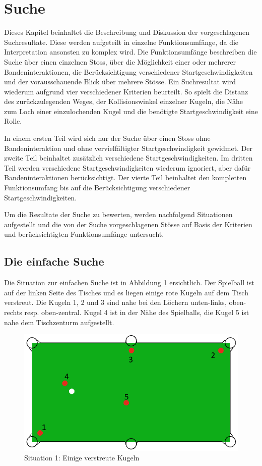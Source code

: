\section{Suche}
Dieses Kapitel beinhaltet die Beschreibung und Diskussion der vorgeschlagenen Suchresultate. Diese werden aufgeteilt
in einzelne Funktionsumfänge, da die Interpretation ansonsten zu komplex wird. Die Funktionsumfänge beschreiben die Suche
über einen einzelnen Stoss, über die Möglichkeit einer oder mehrerer Bandeninteraktionen, die Berücksichtigung verschiedener
Startgeschwindigkeiten und der vorausschauende Blick über mehrere Stösse.
Ein Suchresultat wird wiederum aufgrund vier verschiedener
Kriterien beurteilt. So spielt die Distanz des zurückzulegenden Weges, der Kollisionswinkel einzelner Kugeln, die Nähe
zum Loch einer einzulochenden Kugel und die benötigte Startgeschwindigkeit eine Rolle.

In einem ersten Teil wird sich nur der Suche über einen Stoss ohne Bandeninteraktion und ohne
vervielfältigter Startgeschwindigkeit gewidmet. Der zweite Teil beinhaltet zusätzlich verschiedene Startgeschwindigkeiten.
Im dritten Teil werden verschiedene Startgeschwindigkeiten wiederum ignoriert, aber dafür Bandeninteraktionen berücksichtigt.
Der vierte Teil beinhaltet den kompletten Funktionsumfang bis auf die Berücksichtigung verschiedener Startgeschwindigkeiten.

Um die Resultate der Suche zu bewerten, werden nachfolgend Situationen aufgestellt und die von der Suche
vorgeschlagenen Stösse auf Basis der Kriterien und berücksichtigten Funktionsumfänge untersucht.

\subsection{Die einfache Suche}\label{kap:suche:die_einfache_suche}
Die Situation zur einfachen Suche ist in Abbildung \ref{fig:search_situation_1} ersichtlich.
Der Spielball ist auf der linken Seite des Tisches und es liegen einige rote Kugeln auf dem Tisch verstreut.
Die Kugeln 1, 2 und 3 sind nahe bei den Löchern unten-links, oben-rechts resp. oben-zentral.
Kugel 4 ist in der Nähe des Spielballs, die Kugel 5 ist nahe dem Tischzenturm aufgestellt.

%
%
\begin{figure}[h!]
    \begin{center}
        \includegraphics[width=0.4\linewidth]{../common/04_results/resources/simple_search/situation_diverse.PNG}
    \end{center}
    \caption{Situation 1: Einige verstreute Kugeln}
    \label{fig:search_situation_1}
\end{figure}

